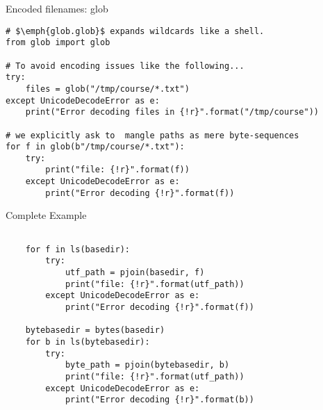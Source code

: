 \begin{frame}[fragile]{Encoded filenames: glob}
\begin{verbatim}
# $\emph{glob.glob}$ expands wildcards like a shell. 
from glob import glob

# To avoid encoding issues like the following...
try:
    files = glob("/tmp/course/*.txt")
except UnicodeDecodeError as e:
    print("Error decoding files in {!r}".format("/tmp/course"))

# we explicitly ask to  mangle paths as mere byte-sequences
for f in glob(b"/tmp/course/*.txt"):
    try:
        print("file: {!r}".format(f))
    except UnicodeDecodeError as e:
        print("Error decoding {!r}".format(f))

\end{verbatim}
\end{frame}


\begin{frame}[fragile]{Complete Example}
\begin{verbatim}

    for f in ls(basedir):
        try:
            utf_path = pjoin(basedir, f)
            print("file: {!r}".format(utf_path))
        except UnicodeDecodeError as e:
            print("Error decoding {!r}".format(f))

    bytebasedir = bytes(basedir)
    for b in ls(bytebasedir):
        try:
            byte_path = pjoin(bytebasedir, b)
            print("file: {!r}".format(utf_path))
        except UnicodeDecodeError as e:
            print("Error decoding {!r}".format(b))
    
\end{verbatim}
\end{frame}
